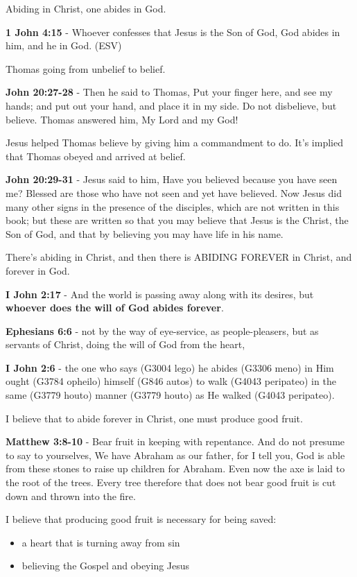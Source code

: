 \documentclass[11pt]{article}
\begin{document}
Abiding in Christ, one abides in God.

\textbf{1 John 4:15} - Whoever confesses that Jesus is the Son of God, God abides in him, and he in God. (ESV)

Thomas going from unbelief to belief.

\textbf{John 20:27-28} - Then he said to Thomas, Put your finger here, and see my hands; and put out your hand, and place it in my side. Do not disbelieve, but believe. Thomas answered him, My Lord and my God!

Jesus helped Thomas believe by giving him a commandment to do. It's implied that Thomas obeyed and arrived at belief.

\textbf{John 20:29-31} - Jesus said to him, Have you believed because you have seen me? Blessed are those who have not seen and yet have believed.  Now Jesus did many other signs in the presence of the disciples, which are not written in this book; but these are written so that you may believe that Jesus is the Christ, the Son of God, and that by believing you may have life in his name.

There's abiding in Christ, and then there is ABIDING FOREVER in Christ, and forever in God.

\textbf{I John 2:17} - And the world is passing away along with its desires, but \textbf{whoever does the will of God abides forever}.

\textbf{Ephesians 6:6} - not by the way of eye-service, as people-pleasers, but as servants of Christ, doing the will of God from the heart,

\textbf{I John 2:6} - the one who says (G3004 lego) he abides (G3306 meno) in Him ought (G3784 opheilo) himself (G846 autos) to walk (G4043 peripateo) in the same (G3779 houto) manner (G3779 houto) as He walked (G4043 peripateo).

I believe that to abide forever in Christ, one must produce good fruit.

\textbf{Matthew 3:8-10} - Bear fruit in keeping with repentance.  And do not presume to say to yourselves, We have Abraham as our father, for I tell you, God is able from these stones to raise up children for Abraham.  Even now the axe is laid to the root of the trees. Every tree therefore that does not bear good fruit is cut down and thrown into the fire.

I believe that producing good fruit is necessary for being saved:
\begin{itemize}
\item a heart that is turning away from sin
\item believing the Gospel and obeying Jesus
\end{itemize}
\end{document}
